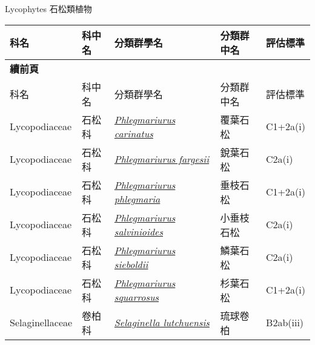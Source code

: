 \noindent\normalfont\selectfont Lycophytes 石松類植物
\footnotesize\selectfont
        {\def\arraystretch{1.5}\tabcolsep=2pt
        \begin{longtable}{p{2.5cm}p{2.5cm}p{4.5cm}p{2.5cm}p{3cm}}
        \toprule
          科名 & 科中名 & 分類群學名 & 分類群中名 & 評估標準 \\
        \midrule 
        \endfirsthead

        {{\bfseries 續前頁 }} \\
        科名 & 科中名 & 分類群學名 & 分類群中名 & 評估標準 \\
        \midrule
        \endhead
                Lycopodiaceae & 石松科 & \href{http://www.theplantlist.org/tpl1.1/search?q=Phlegmariurus+carinatus}{\textit{Phlegmariurus carinatus} } & 覆葉石松 & C1+2a(i) \index{Phlegmariurus@\textit{Phlegmariurus}!carinatus@\textit{carinatus}}  \index{覆葉石松} \\
    Lycopodiaceae & 石松科 & \href{http://www.theplantlist.org/tpl1.1/search?q=Phlegmariurus+fargesii}{\textit{Phlegmariurus fargesii} } & 銳葉石松 & C2a(i) \index{Phlegmariurus@\textit{Phlegmariurus}!fargesii@\textit{fargesii}}  \index{銳葉石松} \\
    Lycopodiaceae & 石松科 & \href{http://www.theplantlist.org/tpl1.1/search?q=Phlegmariurus+phlegmaria}{\textit{Phlegmariurus phlegmaria} } & 垂枝石松 & C1+2a(i) \index{Phlegmariurus@\textit{Phlegmariurus}!phlegmaria@\textit{phlegmaria}}  \index{垂枝石松} \\
    Lycopodiaceae & 石松科 & \href{http://www.theplantlist.org/tpl1.1/search?q=Phlegmariurus+salvinioides}{\textit{Phlegmariurus salvinioides} } & 小垂枝石松 & C2a(i) \index{Phlegmariurus@\textit{Phlegmariurus}!salvinioides@\textit{salvinioides}}  \index{小垂枝石松} \\
    Lycopodiaceae & 石松科 & \href{http://www.theplantlist.org/tpl1.1/search?q=Phlegmariurus+sieboldii}{\textit{Phlegmariurus sieboldii} } & 鱗葉石松 & C2a(i) \index{Phlegmariurus@\textit{Phlegmariurus}!sieboldii@\textit{sieboldii}}  \index{鱗葉石松} \\
    Lycopodiaceae & 石松科 & \href{http://www.theplantlist.org/tpl1.1/search?q=Phlegmariurus+squarrosus}{\textit{Phlegmariurus squarrosus} } & 杉葉石松 & C1+2a(i) \index{Phlegmariurus@\textit{Phlegmariurus}!squarrosus@\textit{squarrosus}}  \index{杉葉石松} \\
    Selaginellaceae & 卷柏科 & \href{http://www.theplantlist.org/tpl1.1/search?q=Selaginella+lutchuensis}{\textit{Selaginella lutchuensis} } & 琉球卷柏 & B2ab(iii) \index{Selaginella@\textit{Selaginella}!lutchuensis@\textit{lutchuensis}}  \index{琉球卷柏} \\
    \bottomrule
        \end{longtable}
        }
    